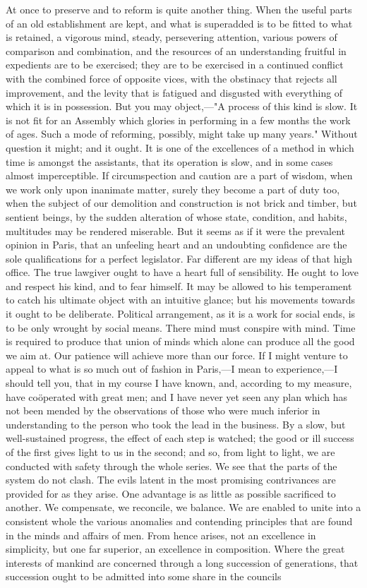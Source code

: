 At once to preserve and to reform is quite another thing. When the useful parts of an old establishment are kept, and what is superadded is to be fitted to what is retained, a vigorous mind, steady, persevering attention, various powers of comparison and combination, and the resources of an understanding fruitful in expedients are to be exercised; they are to be exercised in a continued conflict with the combined force of opposite vices, with the obstinacy that rejects all improvement, and the levity that is fatigued and disgusted with everything of which it is in possession. But you may object,—"A process of this kind is slow. It is not fit for an Assembly which glories in performing in a few months the work of ages. Such a mode of reforming, possibly, might take up many years." Without question it might; and it ought. It is one of the excellences of a method in which time is amongst the assistants, that its operation is slow, and in some cases almost imperceptible. If circumspection and caution are a part of wisdom, when we work only upon inanimate matter, surely they become a part of duty too, when the subject of our demolition and construction is not brick and timber, but sentient beings, by the sudden alteration of whose state, condition, and habits, multitudes may be rendered miserable. But it seems as if it were the prevalent opinion in Paris, that an unfeeling heart and an undoubting confidence are the sole qualifications for a perfect legislator. Far different are my ideas of that high office. The true lawgiver ought to have a heart full of sensibility. He ought to love and respect his kind, and to fear himself. It may be allowed to his temperament to catch his ultimate object with an intuitive glance; but his movements towards it ought to be deliberate. Political arrangement, as it is a work for social ends, is to be only wrought by social means. There mind must conspire with mind. Time is required to produce that union of minds which alone can produce all the good we aim at. Our patience will achieve more than our force. If I might venture to appeal to what is so much out of fashion in Paris,—I mean to experience,—I should tell you, that in my course I have known, and, according to my measure, have coöperated with great men; and I have never yet seen any plan which has not been mended by the observations of those who were much inferior in understanding to the person who took the lead in the business. By a slow, but well-sustained progress, the effect of each step is watched; the good or ill success of the first gives light to us in the second; and so, from light to light, we are conducted with safety through the whole series. We see that the parts of the system do not clash. The evils latent in the most promising contrivances are provided for as they arise. One advantage is as little as possible sacrificed to another. We compensate, we reconcile, we balance. We are enabled to unite into a consistent whole the various anomalies and contending principles that are found in the minds and affairs of men. From hence arises, not an excellence in simplicity, but one far superior, an excellence in composition. Where the great interests of mankind are concerned through a long succession of generations, that succession ought to be admitted into some share in the councils 